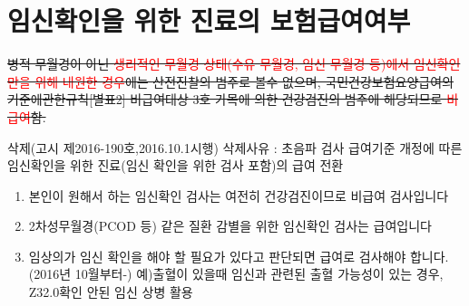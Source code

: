 \section{임신확인을 위한 진료의 보험급여여부}
{
\sout{병적 무월경이 아닌 \textcolor{red}{생리적인 무월경 상태(수유 무월경, 임신 무월경 등)에서 임신확인만을 위해 내원한 경우}에는 산전진찰의 범주로 볼수 없으며, 국민건강보험요양급여의기준에관한규칙[별표2] 비급여대상 3호 가목에 의한 건강검진의 범주에 해당되므로 \textcolor{red}{비급여}함.}\par
삭제(고시 제2016-190호,2016.10.1시행) 삭제사유 : 초음파 검사 급여기준 개정에 따른 임신확인을 위한 진료(임신 확인을 위한 검사 포함)의 급여 전환
\begin{enumerate}\tightlist
\item 본인이 원해서 하는 임신확인 검사는 여전히 건강검진이므로 비급여 검사입니다
\item 2차성무월경(PCOD 등) 같은 질환 감별을 위한 임신확인 검사는 급여입니다
\item 임상의가 임신 확인을 해야 할 필요가 있다고 판단되면 급여로 검사해야 합니다.(2016년 10월부터-)
예)출혈이 있을때 임신과 관련된 출혈 가능성이 있는 경우, Z32.0확인 안된 임신 상병 활용
\end{enumerate}
}
\par
\medskip
{}

